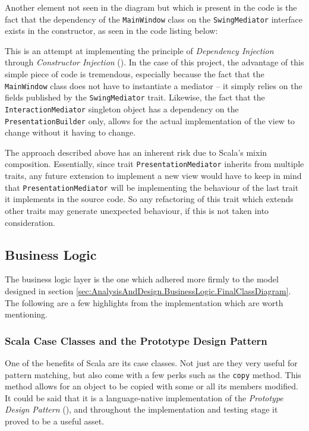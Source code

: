 Another element not seen in the diagram but which is present in the code is the
fact that the dependency of the \texttt{MainWindow} class on the
\texttt{SwingMediator} interface exists in the constructor, as seen in the code
listing below:
{
  \small
  
}

This is an attempt at implementing the principle of \emph{Dependency Injection}
through \emph{Constructor Injection} (\cite[][]{fowler2004inversion}). In the
case of this project, the advantage of this simple piece of code is tremendous,
especially because the fact that the \texttt{MainWindow} class does not have to
instantiate a mediator -- it simply relies on the fields published by the
\texttt{SwingMediator} trait. Likewise, the fact that the
\texttt{InteractionMediator} singleton object has a dependency on the
\texttt{PresentationBuilder} only, allows for the actual implementation of the
view to change without it having to change.


The approach described above has an inherent risk due to Scala's mixin
composition. Essentially, since trait \texttt{PresentationMediator} inherits
from multiple traits, any future extension to implement a new view would have
to keep in mind that \texttt{PresentationMediator} will be implementing the
behaviour of the last trait it implements in the source code. So any
refactoring of this trait which extends other traits may generate unexpected
behaviour, if this is not taken into consideration.


\subsection{Business Logic} \label{sec:Implementation.BusinessLogic}

The business logic layer is the one which adhered more firmly to the model
designed in section
\ref{sec:AnalysisAndDesign.BusinessLogic.FinalClassDiagram}. The following are
a few highlights from the implementation which are worth mentioning.

\subsubsection{Scala Case Classes and the Prototype Design Pattern} \label{sec:Implementation.ScalaCaseClasses}
One of the benefits of Scala are its case classes. Not just are they very
useful for pattern matching, but also come with a few perks such as the
\texttt{copy} method. This method allows for an object to be copied with some
or all its members modified. It could be said that it is a language-native
implementation of the \emph{Prototype Design Pattern}
(\cite[][Ch.~6,~Location~2461]{nikolov2016scala}), and throughout the
implementation and testing stage it proved to be a useful asset.

